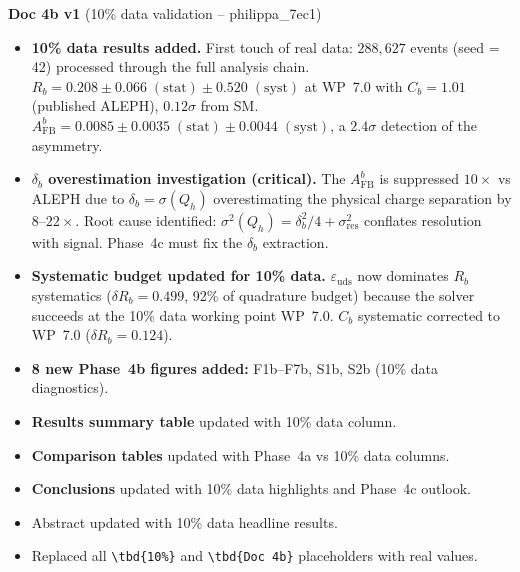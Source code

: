 \documentclass[11pt,a4paper]{article}
\begin{document}
\textbf{Doc 4b v1} (10\% data validation -- philippa\_7ec1)
\begin{itemize}
\item \textbf{10\% data results added.} First touch of real data: $288{,}627$ events
  (seed = 42) processed through the full analysis chain. $R_b = 0.208 \pm 0.066\;\mathrm{(stat)}
  \pm 0.520\;\mathrm{(syst)}$ at WP~7.0 with $C_b = 1.01$ (published ALEPH),
  $0.12\sigma$ from SM. $A_\mathrm{FB}^b = 0.0085 \pm 0.0035\;\mathrm{(stat)}
  \pm 0.0044\;\mathrm{(syst)}$, a $2.4\sigma$ detection of the asymmetry.
\item \textbf{$\delta_b$ overestimation investigation (critical).} The $A_\mathrm{FB}^b$
  is suppressed $10\times$ vs ALEPH due to $\delta_b = \sigma(Q_h)$ overestimating the
  physical charge separation by $8$--$22\times$. Root cause identified:
  $\sigma^2(Q_h) = \delta_b^2/4 + \sigma_\mathrm{res}^2$ conflates resolution with
  signal. Phase~4c must fix the $\delta_b$ extraction.
\item \textbf{Systematic budget updated for 10\% data.} $\varepsilon_\mathrm{uds}$
  now dominates $R_b$ systematics ($\delta R_b = 0.499$, 92\% of quadrature budget) because
  the solver succeeds at the 10\% data working point WP~7.0. $C_b$ systematic
  corrected to WP~7.0 ($\delta R_b = 0.124$).
\item \textbf{8 new Phase~4b figures added:} F1b--F7b, S1b, S2b (10\% data diagnostics).
\item \textbf{Results summary table} updated with 10\% data column.
\item \textbf{Comparison tables} updated with Phase~4a vs 10\% data columns.
\item \textbf{Conclusions} updated with 10\% data highlights and Phase~4c outlook.
\item Abstract updated with 10\% data headline results.
\item Replaced all \texttt{\textbackslash tbd\{10\%\}} and \texttt{\textbackslash tbd\{Doc 4b\}}
  placeholders with real values.
\end{itemize}
\end{document}
